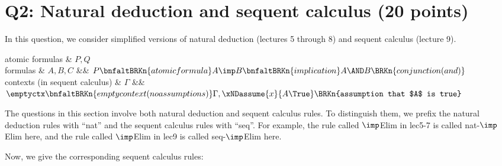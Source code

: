 \clearpage


\section{Q2: Natural deduction and sequent calculus (20 points)}

In this question, we consider simplified versions of natural deduction
(lectures 5 through 8) and sequent calculus (lecture 9).

\begin{grammar}
  atomic formulas
  &
  $P, Q$
  \\
  formulas
  &
  $A, B, C$
  &\bnfas&
  $P
  \bnfaltBRKn{atomic formula}
  A \imp B
  \bnfaltBRKn{implication}
  A \AND B
  \BRKn{conjunction (and)}
  $
  \\[1ex]
  contexts (in sequent calculus)
  &
  $\Gamma$
  &\bnfas&
  $\emptyctx \bnfaltBRKn{empty context (no assumptions)}
  \Gamma, \xNDassume{x}{A \True}
  \BRKn{assumption that $A$ is true}
  $
\end{grammar}

The questions in this section involve both natural deduction
and sequent calculus rules.  To distinguish them, we prefix the
natural deduction rules with ``nat'' and the sequent calculus rules
with ``seq''.  For example, the rule called $\imp$Elim in lec5-7
is called nat-$\imp$Elim here, and the rule called $\imp$Elim in lec9
is called seq-$\imp$Elim here.

\bigskip

  \vspace*{-1ex}

Now, we give the corresponding sequent calculus rules:

